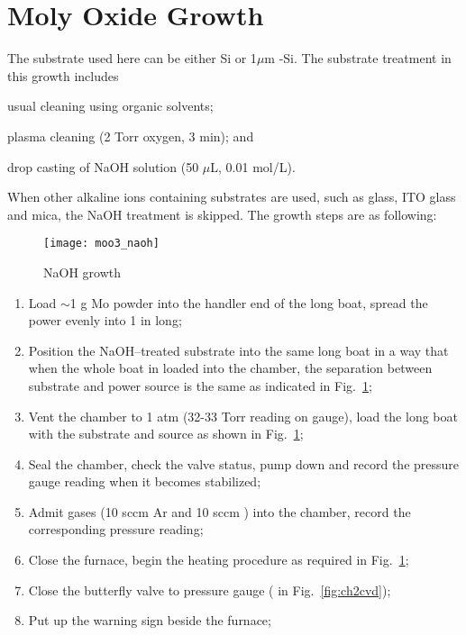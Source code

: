 \section{Moly Oxide Growth}

The substrate used here can be either Si or 1$\mu$m -Si. The substrate treatment in this growth includes \begin{enumerate*}[label=\itshape\alph*\upshape)]
\item usual cleaning using organic solvents;
\item plasma cleaning (2 Torr oxygen, 3 min); and
\item drop casting of NaOH solution (50 $\mu$L, 0.01 mol/L).
\end{enumerate*} When other alkaline ions containing substrates are used, such as glass, ITO glass and mica, the NaOH treatment is skipped. The growth steps are as following: 

\begin{figure}[htb]
\centering
\texttt{[image: moo3\_naoh]}
\caption{NaOH  growth}
\label{fig:namo}
\end{figure}

\begin{enumerate}
\item Load $\sim$1 g Mo powder into the handler end of the long boat, spread the power evenly into 1 in long;
\item Position the NaOH--treated substrate into the same long boat in a way that when the whole boat in loaded into the chamber, the separation between substrate and power source is the same as indicated in Fig.~\ref{fig:namo};
\item Vent the chamber to 1 atm (32-33 Torr reading on gauge), load the long boat with the substrate and source as shown in Fig.~\ref{fig:namo};
\item Seal the chamber, check the valve status, pump down and record the pressure gauge reading when it becomes stabilized; 
\item Admit gases (10 sccm Ar and 10 sccm ) into the chamber, record the corresponding pressure reading;
\item Close the furnace, begin the heating procedure as required in Fig.~\ref{fig:namo}; 
\item Close the butterfly valve to pressure gauge ( in Fig.~\ref{fig:ch2cvd});
\item Put up the warning sign beside the furnace;
\end{enumerate}








